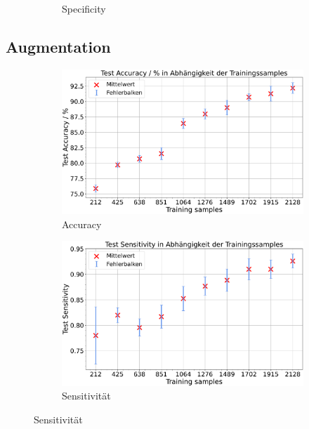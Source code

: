 \begin{figure}[htbp]
\begin{subfigure}[b]{0.48\textwidth}
    \caption{Specificity}
    \label{fig:gli-men-spec}
  \end{subfigure}
  \caption{}
  \label{fig:gli-men-reduktion}
\end{figure}

\subsection{Augmentation}

\begin{figure}[htbp]
  \centering
  \begin{subfigure}[b]{0.48\textwidth}
    \centering
    \includegraphics[width=\textwidth]{plots/Augm-Gli-Men_Accuracy_mean.pdf}
    \caption{Accuracy}
    \label{fig:augm-acc}
  \end{subfigure}
  \begin{subfigure}[b]{0.48\textwidth}
    \centering
    \includegraphics[width=\textwidth]{plots/Augm-Gli-Men_Sensitivity_mean.pdf}
    \caption{Sensitivität}
    \label{fig:augm-sens}
  \end{subfigure}

\end{figure}
